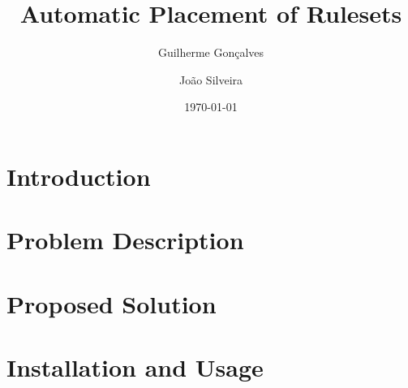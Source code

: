 \documentclass[a4paper, 11pt]{article}
\title{Automatic Placement of Rulesets}
\author{Guilherme Gonçalves \and João Silveira}
\date{\today}
\begin{document}
\maketitle

\clearpage
\tableofcontents
\clearpage

\section{Introduction}


\section{Problem Description}


\section{Proposed Solution}


\section{Installation and Usage}



% 
\end{document}
